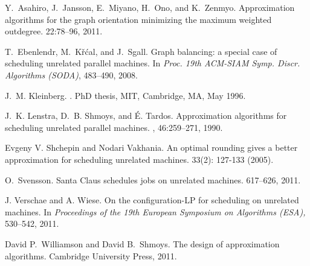 \documentclass[11pt]{article}\usepackage{amsmath}
\begin{document}
\begin{thebibliography}{1}

Y.~Asahiro, J.~Jansson, E.~Miyano, H.~Ono, and K.~Zenmyo.
\newblock Approximation algorithms for the graph 
orientation minimizing  the maximum weighted outdegree.
 22:78--96, 2011. 

T.~Ebenlendr, M.~K\v{r}\'{c}al,  and J.~Sgall.
\newblock Graph balancing: a special case of scheduling unrelated parallel
  machines.
\newblock In {\em Proc. 19th  ACM-SIAM
  Symp.  Discr. Algorithms (SODA)}, 483--490, 
  2008.

J.~M. Kleinberg.
.
\newblock PhD thesis, MIT, Cambridge, MA, May 1996.

J.~K. Lenstra, D.~B. Shmoys, and \'{E}. Tardos.
\newblock Approximation algorithms for scheduling unrelated parallel machines.
, 46:259--271, 1990.

Evgeny V. Shchepin  and Nodari Vakhania.
\newblock An optimal rounding gives a better approximation for scheduling unrelated machines.  33(2): 127-133 (2005). 

O.~Svensson.
\newblock Santa {C}laus schedules jobs on unrelated machines.
  617--626, 2011.

 
J. Verschae and A. Wiese.
\newblock On the configuration-{LP} for scheduling on unrelated machines.
\newblock In {\em Proceedings of the 19th European Symposium on Algorithms
  (ESA),} 530--542, 2011. 

David P.~Williamson and  David B.~Shmoys.
\newblock The design of approximation algorithms.
\newblock Cambridge University Press, 2011.



\end{thebibliography}
\end{document}
